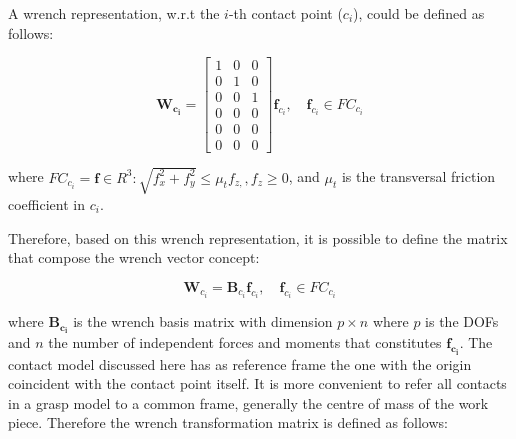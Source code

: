 \begin{figure}[h!]
\end{figure}

A wrench representation, w.r.t the $i$-th contact point ($c_i$), could be defined as follows:

\begin{equation}
\mathbf{W_{c_i}}=\begin{bmatrix}
1 & 0 & 0 \\ 
0 & 1 & 0 \\ 
0 & 0 & 1 \\ 
0 & 0 & 0 \\ 
0 & 0 & 0 \\ 
0 & 0 & 0 
\end{bmatrix} \mathbf{f}_{c_i}, \quad \mathbf{f}_{c_i} \in F C_{c_i}
\end{equation}

\noindent
where $F C_{c_i}=\mathbf{f} \in \!R^3: \sqrt{f_{x}^{2}+f_{y}^{2}} \leq \mu_{t} f_{z,}, f_{z} \geq 0$, and $\mu_t$ is the transversal friction coefficient in $c_i$. 

Therefore, based on this wrench representation, it is possible to define the matrix that compose the wrench vector concept:

\begin{equation}
\mathbf{W}_{c_i}=\mathbf{B}_{c_i} \mathbf{f}_{c_i}, \quad \mathbf{f}_{c_i} \in F C_{c_i}
\end{equation}

\noindent
where $\mathbf{{B}_{c_i}}$ is the wrench basis matrix with dimension $p \times n$ where $p$ is the \acp{DOF} and $n$ the number of independent forces and moments that constitutes $\mathbf{{f}_{c_i}}$. The contact model discussed here has as reference frame the one with the origin coincident with the contact point itself. It is more convenient to refer all contacts in a grasp model to a common frame, generally the centre of mass of the work piece. Therefore the wrench transformation matrix is defined as follows:

